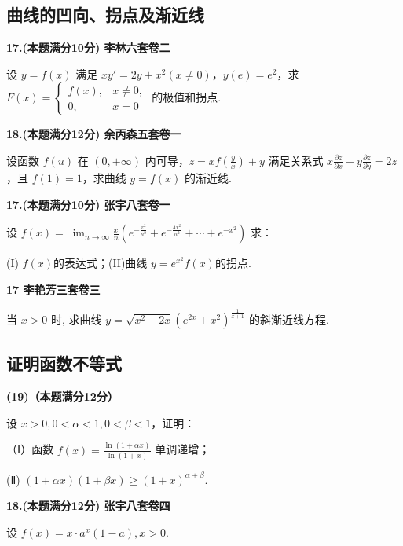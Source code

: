 \documentclass[a4paper,12pt]{article}
\begin{document}
\subsection{曲线的凹向、拐点及渐近线}

\textbf{17.(本题满分10分) 李林六套卷二}

设 $y = f(x)$ 满足 $xy' = 2y + x^{2}(x \neq 0)$，$y(e) = e^{2}$，求 $F(x) = \begin{cases} f(x), & x \neq 0, \\ 0, & x = 0 \end{cases}$ 的极值和拐点.

\vspace{0.5cm}

\textbf{18.(本题满分12分) 余丙森五套卷一}

设函数 $f(u)$ 在 $(0, +\infty)$ 内可导，$z = x f\left(\frac{y}{x}\right) + y$ 满足关系式 $x \frac{\partial z}{\partial x} - y \frac{\partial z}{\partial y} = 2z$，且 $f(1) = 1$，求曲线 $y = f(x)$ 的渐近线.

\vspace{0.5cm}

\textbf{17.(本题满分10分) 张宇八套卷一}

设 $f(x)=\lim_{n\to\infty}\frac{x}{n}\left(e^{-\frac{x^{2}}{n^{2}}}+e^{-\frac{4x^{2}}{n^{2}}}+\cdots+e^{-x^{2}}\right)$ 求：

(I) $f(x)$的表达式；(II)曲线 $y=e^{x^{2}}f(x)$的拐点.

\vspace{0.5cm}

\textbf{17 李艳芳三套卷三}

当 $x > 0$ 时, 求曲线 $y = \sqrt{x^{2} + 2x} (e^{2x} + x^{2})^{\frac{1}{x+1}}$ 的斜渐近线方程.

\subsection{证明函数不等式}

\textbf{(19)（本题满分12分）}

设 $x>0,0<\alpha<1,0<\beta<1$，证明：

（Ⅰ）函数 $f(x)=\frac{\ln(1+\alpha x)}{\ln(1+x)}$ 单调递增；

(Ⅱ) $(1 + \alpha x)(1 + \beta x) \geqslant (1 + x)^{\alpha + \beta}$.

\vspace{0.5cm}

\textbf{18.(本题满分12分) 张宇八套卷四}

设 $f(x)=x\cdot a^{x}(1-a),x>0.$
\end{document}
